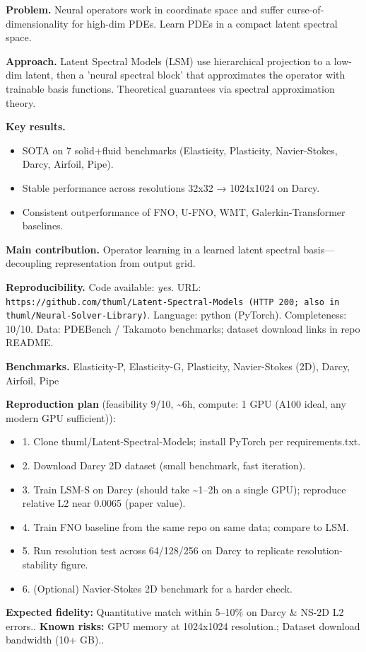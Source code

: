 \documentclass[10pt,letterpaper]{article}
\begin{document}
\textbf{Problem.} Neural operators work in coordinate space and suffer curse-of-dimensionality for high-dim PDEs. Learn PDEs in a compact latent spectral space.

\textbf{Approach.} Latent Spectral Models (LSM) use hierarchical projection to a low-dim latent, then a 'neural spectral block' that approximates the operator with trainable basis functions. Theoretical guarantees via spectral approximation theory.

\textbf{Key results.}
\begin{itemize}
\item SOTA on 7 solid+fluid benchmarks (Elasticity, Plasticity, Navier-Stokes, Darcy, Airfoil, Pipe).
\item Stable performance across resolutions 32x32 → 1024x1024 on Darcy.
\item Consistent outperformance of FNO, U-FNO, WMT, Galerkin-Transformer baselines.
\end{itemize}

\textbf{Main contribution.} Operator learning in a learned latent spectral basis—decoupling representation from output grid.

\textbf{Reproducibility.} Code available: \emph{yes}. URL: \texttt{https://github.com/thuml/Latent-Spectral-Models (HTTP 200; also in thuml/Neural-Solver-Library)}. Language: python (PyTorch). Completeness: 10/10. Data: PDEBench / Takamoto benchmarks; dataset download links in repo README.

\textbf{Benchmarks.} Elasticity-P, Elasticity-G, Plasticity, Navier-Stokes (2D), Darcy, Airfoil, Pipe

\textbf{Reproduction plan} (feasibility 9/10, \textasciitilde6h, compute: 1 GPU (A100 ideal, any modern GPU sufficient)):
\begin{itemize}
\item 1. Clone thuml/Latent-Spectral-Models; install PyTorch per requirements.txt.
\item 2. Download Darcy 2D dataset (small benchmark, fast iteration).
\item 3. Train LSM-S on Darcy (should take \~{}1–2h on a single GPU); reproduce relative L2 near 0.0065 (paper value).
\item 4. Train FNO baseline from the same repo on same data; compare to LSM.
\item 5. Run resolution test across 64/128/256 on Darcy to replicate resolution-stability figure.
\item 6. (Optional) Navier-Stokes 2D benchmark for a harder check.
\end{itemize}
\textbf{Expected fidelity:} Quantitative match within 5–10\% on Darcy \& NS-2D L2 errors.. \textbf{Known risks:} GPU memory at 1024x1024 resolution.; Dataset download bandwidth (10+ GB)..
\end{document}
